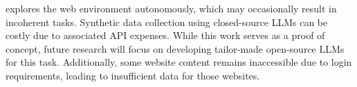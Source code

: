 \model explores the web environment autonomously, which may occasionally result in incoherent tasks.
Synthetic data collection using closed-source LLMs can be costly due to associated API expenses.
While this work serves as a proof of concept, future research will focus on developing tailor-made open-source LLMs for this task.
Additionally, some website content remains inaccessible due to login requirements, leading to insufficient data for those websites.
